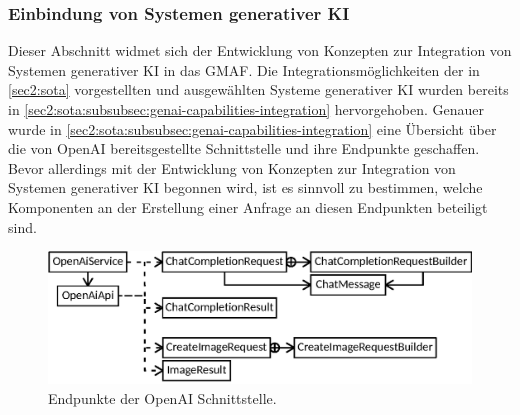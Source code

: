 %
%
%
%
%

\subsubsection{Einbindung von Systemen generativer KI}
\label{sec3:model:subsubsec:genai-integration}
Dieser Abschnitt widmet sich der Entwicklung von Konzepten zur Integration von Systemen generativer KI in das GMAF.
Die Integrationsmöglichkeiten der in \cref{sec2:sota} vorgestellten und ausgewählten Systeme generativer KI wurden bereits in \cref{sec2:sota:subsubsec:genai-capabilities-integration} hervorgehoben.
Genauer wurde in \cref{sec2:sota:subsubsec:genai-capabilities-integration} eine Übersicht über die von OpenAI bereitsgestellte Schnittstelle und ihre Endpunkte geschaffen.
Bevor allerdings mit der Entwicklung von Konzepten zur Integration von Systemen generativer KI begonnen wird, ist es sinnvoll zu bestimmen, welche Komponenten an der Erstellung einer Anfrage an diesen Endpunkten beteiligt sind.

\begin{figure}[htb]
    \centering
    \includegraphics{chapter/chapter_3/mechanisms/openai-endpoint-mech.eps}
    \caption{Endpunkte der OpenAI Schnittstelle.}
    \label{sec3:model:subsubsec:genai-integration:fig:openai-endpoint-comps}
\end{figure}

